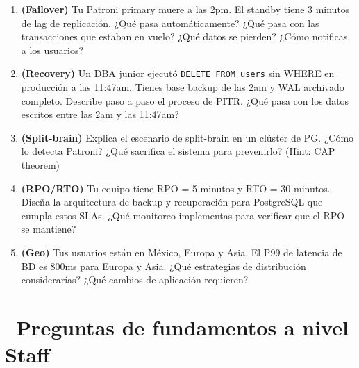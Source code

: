\begin{entrevistabox}
\begin{enumerate}
  \item \textbf{(Failover)} Tu Patroni primary muere a las 2pm. El standby tiene 3 minutos de lag de replicación. ¿Qué pasa automáticamente? ¿Qué pasa con las transacciones que estaban en vuelo? ¿Qué datos se pierden? ¿Cómo notificas a los usuarios?

  \item \textbf{(Recovery)} Un DBA junior ejecutó \texttt{DELETE FROM users} sin WHERE en producción a las 11:47am. Tienes base backup de las 2am y WAL archivado completo. Describe paso a paso el proceso de PITR. ¿Qué pasa con los datos escritos entre las 2am y las 11:47am?

  \item \textbf{(Split-brain)} Explica el escenario de split-brain en un clúster de PG. ¿Cómo lo detecta Patroni? ¿Qué sacrifica el sistema para prevenirlo? (Hint: CAP theorem)

  \item \textbf{(RPO/RTO)} Tu equipo tiene RPO = 5 minutos y RTO = 30 minutos. Diseña la arquitectura de backup y recuperación para PostgreSQL que cumpla estos SLAs. ¿Qué monitoreo implementas para verificar que el RPO se mantiene?

  \item \textbf{(Geo)} Tus usuarios están en México, Europa y Asia. El P99 de latencia de BD es 800ms para Europa y Asia. ¿Qué estrategias de distribución considerarías? ¿Qué cambios de aplicación requieren?
\end{enumerate}
\end{entrevistabox}

\section[Preguntas de fundamentos a nivel Staff]{~Preguntas de fundamentos a nivel Staff}

